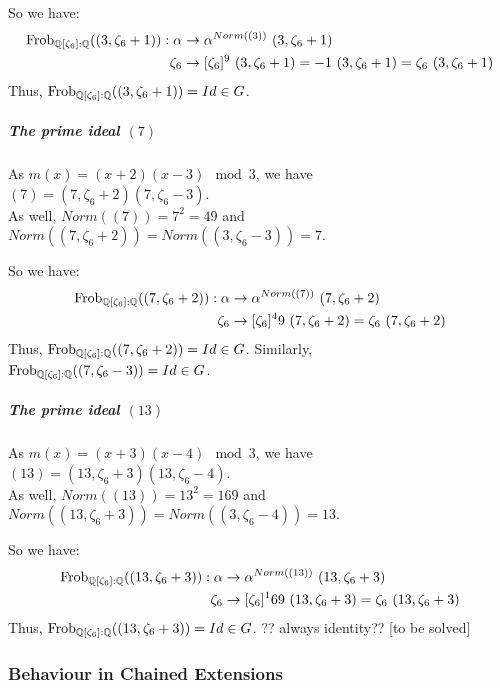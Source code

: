 So we have:
\begin{align*}
    \text{Frob}_{\mathbb{Q}[\zeta_6]:\mathbb{Q}}((3, \zeta_6+1)): \alpha & \to \alpha^{Norm((3))} \ (3, \zeta_6+1)\\
    \zeta_6   & \to [\zeta_6]^9 \ (3, \zeta_6+1) = -1 \ (3, \zeta_6+1) = \zeta_6 \ (3, \zeta_6+1)
\end{align*}
Thus, $\text{Frob}_{\mathbb{Q}[\zeta_6]:\mathbb{Q}}((3, \zeta_6+1)) = Id \in G$.

\subparagraph{The prime ideal $(7)$}
As $m(x) = (x+2)(x-3) \mod 3$, we have $(7) = (7, \zeta_6+2)(7, \zeta_6-3)$.\\
As well, $Norm((7)) = 7^2 = 49$ and $Norm((7, \zeta_6+2)) = Norm((3, \zeta_6-3)) = 7$.

So we have:
\begin{align*}
    \text{Frob}_{\mathbb{Q}[\zeta_6]:\mathbb{Q}}((7, \zeta_6+2)): \alpha & \to \alpha^{Norm((7))} \ (7, \zeta_6+2)\\
    \zeta_6   & \to [\zeta_6]^49 \ (7, \zeta_6+2) = \zeta_6 \ (7, \zeta_6+2)
\end{align*}
Thus, $\text{Frob}_{\mathbb{Q}[\zeta_6]:\mathbb{Q}}((7, \zeta_6+2)) = Id \in G$.
Similarly, $\text{Frob}_{\mathbb{Q}[\zeta_6]:\mathbb{Q}}((7, \zeta_6-3)) = Id \in G$.

\subparagraph{The prime ideal $(13)$}
As $m(x) = (x+3)(x-4) \mod 3$, we have $(13) = (13, \zeta_6+3)(13, \zeta_6-4)$.\\
As well, $Norm((13)) = 13^2 = 169$ and $Norm((13, \zeta_6+3)) = Norm((3, \zeta_6-4)) = 13$.

So we have:
\begin{align*}
    \text{Frob}_{\mathbb{Q}[\zeta_6]:\mathbb{Q}}((13, \zeta_6+3)): \alpha & \to \alpha^{Norm((13))} \ (13, \zeta_6+3)\\
    \zeta_6   & \to [\zeta_6]^169 \ (13, \zeta_6+3) = \zeta_6 \ (13, \zeta_6+3)
\end{align*}
Thus, $\text{Frob}_{\mathbb{Q}[\zeta_6]:\mathbb{Q}}((13, \zeta_6+3)) = Id \in G$.
?? always identity?? [to be solved]



\subsubsection{Behaviour in Chained Extensions}

